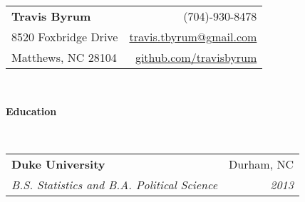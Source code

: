 \documentclass[letterpaper,12pt]{article}
\makeatletter
\newcommand{\resheading}[1]{{\large \colorbox{mygrey}{\begin{minipage}{\textwidth}{\textbf{#1 \vphantom{p\^{E}}}}\end{minipage}}}}
\newcommand{\ressubheading}[4]{
\begin{tabular*}{6.9in}{l@{\extracolsep{\fill}}r}
		\textbf{#1} & #2 \\
		\textit{#3} & \textit{#4} \\
\end{tabular*}\vspace{-6pt}}
\makeatother
\begin{document}
\newcommand{\mywebheader}{
\begin{tabular*}{7in}{l@{\extracolsep{\fill}}r}
	\textbf{\Huge Travis Byrum}  & (704)-930-8478\\
	8520 Foxbridge Drive & \href{mailto:travis.tbyrum@gmail.com}{travis.tbyrum@gmail.com} \\
	Matthews, NC 28104 & \href{https://github.com/travisbyrum}{github.com/travisbyrum}\\
\end{tabular*}
\\
\vspace{0.1in}}

\mywebheader

\resheading{Education}
\\
			\ressubheading{Duke University}{Durham, NC}{B.S. Statistics and B.A. Political Science}{2013}
\end{document}
